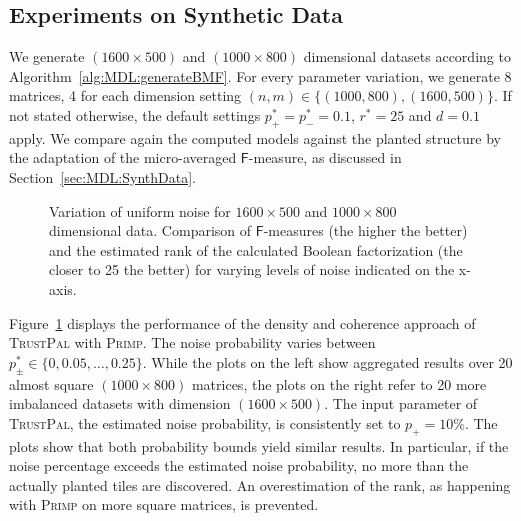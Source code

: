 \subsection{Experiments on Synthetic Data}
We generate $(1600\times 500)$ and $(1000\times 800)$ dimensional datasets according to Algorithm~\ref{alg:MDL:generateBMF}. For every parameter variation, we generate 8 matrices, 4 for each dimension setting $(n,m)\in\{(1000,800),(1600,500)\}$. If not stated otherwise, the default settings $p_+^*=p_-^*=0.1$, $r^*=25$ and $d=0.1$ apply. 
We compare again the computed models against the planted structure by the adaptation of the micro-averaged $\mathsf{F}$-measure, as discussed in Section~\ref{sec:MDL:SynthData}.
\begin{figure}[t]
\centering

\caption{Variation of uniform noise for $1600\times 500$ and $1000\times 800$ dimensional data. Comparison of $\mathsf{F}$-measures (the higher the better) and the estimated rank of the calculated Boolean factorization (the closer to 25 the better) for varying levels of noise indicated on the x-axis.}
\label{fig:TP:noise}
\end{figure}

Figure~\ref{fig:TP:noise} displays the performance of the density and coherence approach of \textsc{TrustPal} with \textsc{Primp}. The noise probability varies between $p_\pm^*\in\{0,0.05,\ldots,0.25\}$. While the plots on the left show aggregated results over 20 almost square $(1000\times 800)$ matrices, the plots on the right refer to 20 more imbalanced datasets with dimension $(1600\times 500)$. The input parameter of \textsc{TrustPal}, the estimated noise probability, is consistently set to $p_+=10\%$. The plots show that both probability bounds yield similar results. In particular, if the noise percentage exceeds the estimated noise probability, no more than the actually planted tiles are discovered. An overestimation of the rank, as happening with \textsc{Primp} on more square matrices, is prevented. 

